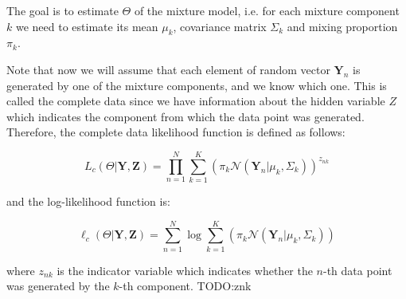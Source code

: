 The goal is to estimate $\Theta$ of the mixture model, 
i.e. for each mixture component $k$ we need to estimate its mean $\mu_k$, covariance matrix $\Sigma_k$ and mixing proportion $\pi_k$. 

Note that now we will assume that each element of random vector $\textbf{Y}_n$ is generated by one of the mixture components, and we know which one. 
This is called the complete data since we have information about the hidden variable $Z$ which indicates the component from which the data point was generated.
Therefore, the complete data likelihood function is defined as follows: 

\begin{equation}
    L_c(\Theta|\textbf{Y},\textbf{Z}) = \prod_{n=1}^{N} \sum_{k=1}^{K} \left(\pi_k \mathcal{N}(\textbf{Y}_n|\mu_k,\Sigma_k)\right)^{z_{nk}}
\end{equation}

and the log-likelihood function is:

\begin{equation}
    \ell_c(\Theta|\textbf{Y},\textbf{Z}) = \sum_{n=1}^{N} \log \sum_{k=1}^{K} \left(\pi_k \mathcal{N}(\textbf{Y}_n|\mu_k,\Sigma_k)\right)
\end{equation}

where $z_{nk}$ is the indicator variable which indicates whether the $n$-th data point was generated by the $k$-th component.
TODO:znk
